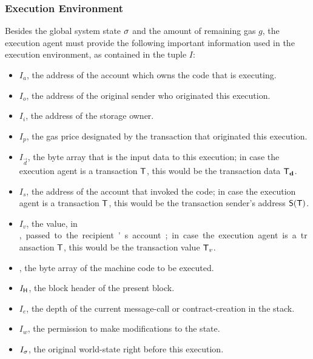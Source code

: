 \subsubsection{Execution Environment}
\label{subsubsec:exe_env}
Besides the global system state $\mathbf{\sigma}$ and the amount of remaining gas $g$, 
the execution agent must provide the following important information used in the execution environment, as contained in the tuple $I$:
\begin{itemize}[nosep]
	\item $I_a$, the address of the account which owns the code that is executing.
	
	\item $I_o$, the address of the original sender who originated this execution.
	
	\item $I_i$, the address of the storage owner.

	\item $I_p$, the gas price designated by the transaction that originated this execution.

	\item $I_{\vec{d}}$, the byte array that is the input data to this execution; in case the execution agent is a transaction $\textsf{T}$, this would be the transaction data $\textsf{T}_{\mathbf{d}}$.

	\item $I_s$, the address of the account that invoked the code; in case the execution agent is a transaction $\textsf{T}$, this would be the transaction sender's address $\mathsf{S}{\left({\textsf{T}} \right)}$.

	 \item $I_v$, the value, in \unit, passed to the recipient's account; in case the execution agent is a transaction $\textsf{T}$, this would be the transaction value $\textsf{T}_v$.

	 \item {}, the byte array of the machine code to be executed.

	 \item $I_{\textsf{H}}$, the block header of the present block.

	 \item $I_e$, the depth of the current message-call or contract-creation in the stack.

	 \item $I_w$, the permission to make modifications to the state.

	 \item $I_{\mathbf{\sigma}}$, the original world-state right before this execution.
\end{itemize}

